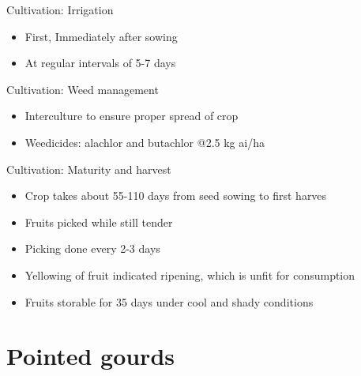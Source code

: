 \documentclass[
  ignorenonframetext,
  aspectratio=169]{beamer}
\providecommand{\tightlist}{%
  \setlength{\itemsep}{0pt}\setlength{\parskip}{0pt}}
\begin{document}
\begin{frame}{Cultivation: Irrigation}
\protect\hypertarget{cultivation-irrigation-1}{}
\begin{itemize}
\tightlist
\item
  First, Immediately after sowing
\item
  At regular intervals of 5-7 days
\end{itemize}
\end{frame}

\begin{frame}{Cultivation: Weed management}
\protect\hypertarget{cultivation-weed-management}{}
\begin{itemize}
\tightlist
\item
  Interculture to ensure proper spread of crop
\item
  Weedicides: alachlor and butachlor @2.5 kg ai/ha
\end{itemize}
\end{frame}

\begin{frame}{Cultivation: Maturity and harvest}
\protect\hypertarget{cultivation-maturity-and-harvest}{}
\begin{itemize}
\tightlist
\item
  Crop takes about 55-110 days from seed sowing to first harves
\item
  Fruits picked while still tender
\item
  Picking done every 2-3 days
\item
  Yellowing of fruit indicated ripening, which is unfit for consumption
\item
  Fruits storable for 35 days under cool and shady conditions
\end{itemize}
\end{frame}

\hypertarget{pointed-gourds}{%
\section{Pointed gourds}\label{pointed-gourds}}
\end{document}
